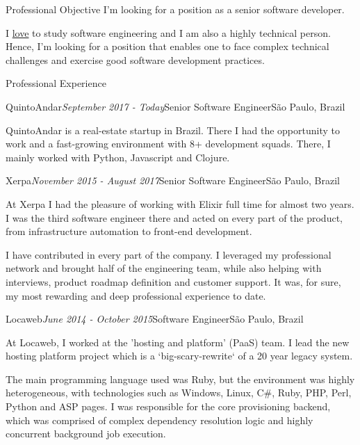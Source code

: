 \documentclass{resume} %
\begin{document}
\begin{rSection}{Professional Objective}
  I'm looking for a position as a senior software developer.

  I \underline{love} to study software engineering and I am also a highly
  technical person. Hence, I'm looking for a position that enables one to face
  complex technical challenges and exercise good software development practices.
\end{rSection}

\begin{rSection}{Professional Experience}
  \begin{rSubsection}{QuintoAndar}{\em September 2017 - Today}{Senior Software Engineer}{São
      Paulo, Brazil}

  \item QuintoAndar is a real-estate startup in Brazil. There I had the
    opportunity to work and a fast-growing environment with 8+ development
    squads. There, I mainly worked with Python, Javascript and Clojure.
  \end{rSubsection}

  \begin{rSubsection}{Xerpa}{\em November 2015 - August 2017}{Senior Software Engineer}{São
      Paulo, Brazil}

  \item At Xerpa I had the pleasure of working with Elixir full time for almost
    two years. I was the third software engineer there and acted on every part
    of the product, from infrastructure automation to front-end development.

  \item I have contributed in every part of the company. I leveraged my
    professional network and brought half of the engineering team, while also
    helping with interviews, product roadmap definition and customer support. It
    was, for sure, my most rewarding and deep professional experience to date.
  \end{rSubsection}

  \begin{rSubsection}{Locaweb}{\em June 2014 - October 2015}{Software Engineer}{São
      Paulo, Brazil}

  \item At Locaweb, I worked at the 'hosting and platform' (PaaS) team. I lead
    the new hosting platform project which is a `big-scary-rewrite` of a 20 year
    legacy system.

  \item The main programming language used was Ruby, but the environment was
    highly heterogeneous, with technologies such as Windows, Linux, C\#, Ruby,
    PHP, Perl, Python and ASP pages. I was responsible for the core provisioning
    backend, which was comprised of complex dependency resolution logic and
    highly concurrent background job execution.
  \end{rSubsection}


\end{rSection}
\end{document}

